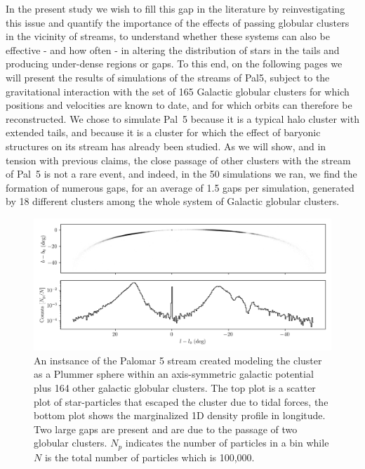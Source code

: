 \documentclass[draft]{aa}
\begin{document}
  In the present study we wish to fill this gap in the literature by reinvestigating this issue and quantify the importance of the effects of passing globular clusters in the vicinity of streams, to understand whether these systems can also be effective - and how often - in altering the distribution of stars in the tails and producing under-dense regions or gaps. To this end, on the following pages we will present the results of simulations of the streams of Pal5, subject to the gravitational interaction with the set of 165 Galactic globular clusters for which positions and velocities are known to date, and for which orbits can therefore be reconstructed. We chose to simulate Pal~5 because it is a typical halo cluster with extended tails, and because it is a cluster for which the effect of baryonic structures on its stream has already been studied. As we will show, and in tension with previous claims, the close passage of other clusters with the stream of Pal~5 is not a rare event, and indeed, in the 50 simulations we ran, we find the formation of numerous gaps, for an average of 1.5 gaps per simulation, generated by 18 different clusters among the whole system of Galactic globular clusters.

  \begin{figure}
    \centering
    \includegraphics[width=\linewidth]{stream_on_sky_Pal5_monte-carlo-009_pouliasis2017pii-GCNBody.png}
    \caption{An instsance of the Palomar 5 stream created modeling the cluster as a Plummer sphere within an axis-symmetric galactic potential plus 164 other galactic globular clusters. The top plot is a scatter plot of star-particles that escaped the cluster due to tidal forces, the bottom plot shows the marginalized 1D density profile in longitude. Two large gaps are present and are due to the passage of two globular clusters. $N_p$ indicates the number of particles in a bin while $N$ is the total number of particles which is 100,000.}
    \label{fig:stream_on_sky}
    \end{figure}
\end{document}
